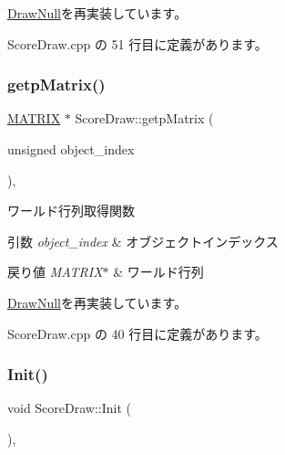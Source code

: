 \mbox{\hyperlink{class_draw_null_a0c1efe55fea325ad277594be6fe1e938}{Draw\+Null}}を再実装しています。



 Score\+Draw.\+cpp の 51 行目に定義があります。

\mbox{\label{class_score_draw_adb995c83624c2eab8b8a15d1182df5b8}} 
\subsubsection{\texorpdfstring{getp\+Matrix()}{getpMatrix()}}
{\footnotesize\ttfamily \mbox{\hyperlink{_matrix_8h_a032295cd9fb1b711757c90667278e744}{M\+A\+T\+R\+IX}} $\ast$ Score\+Draw\+::getp\+Matrix (\begin{DoxyParamCaption}\item[{unsigned}]{object\+\_\+index }\end{DoxyParamCaption})\hspace{0.3cm}{\ttfamily [override]}, {\ttfamily [virtual]}}



ワールド行列取得関数 


\begin{DoxyParams}{引数}
{\em object\+\_\+index} & オブジェクトインデックス \\
\hline
\end{DoxyParams}

\begin{DoxyRetVals}{戻り値}
{\em M\+A\+T\+R\+I\+X$\ast$} & ワールド行列 \\
\hline
\end{DoxyRetVals}


\mbox{\hyperlink{class_draw_null_a9aac059eb3b5d1f77e8bd3aa0647cff9}{Draw\+Null}}を再実装しています。



 Score\+Draw.\+cpp の 40 行目に定義があります。

\mbox{\label{class_score_draw_af013abb96136825e71d4fee06529fc69}} 
\subsubsection{\texorpdfstring{Init()}{Init()}}
{\footnotesize\ttfamily void Score\+Draw\+::\+Init (\begin{DoxyParamCaption}{ }\end{DoxyParamCaption})\hspace{0.3cm}{\ttfamily [override]}, {\ttfamily [virtual]}}



